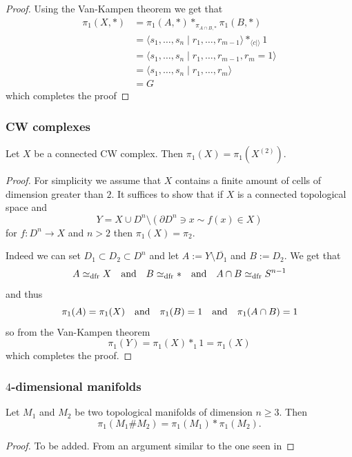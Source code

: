 \documentclass[11pt,a4paper]{article}
\begin{document}
\begin{proof}
  Using the Van-Kampen theorem we get that
  \begin{align*}
    \pi_1(X,*) &= \pi_1(A,*) *_{\pi_{A \cap B,*}} \pi_1(B,*) \\
               &= \langle s_1,\dots,s_n \mid r_1,\dots,r_{m-1} \rangle
                  *_{\langle c \mid \rangle} 1 \\
               &= \langle s_1,\dots,s_n \mid r_1,\dots,r_{m-1},r_m = 1 
               \rangle \\
               &= \langle s_1,\dots,s_n \mid r_1,\dots,r_m \rangle \\
               &= G
  \end{align*}
  which completes the proof
\end{proof}

\subsubsection{CW complexes}
\begin{theorem}
  \label{thm:two-skeleton-determines-fundamental-group}
  Let $X$ be a connected CW complex.
  Then $\pi_1(X) = \pi_1(X^{(2)})$.
\end{theorem}
\begin{proof}
  For simplicity we assume that $X$ contains a finite amount of
  cells of dimension greater than $2$.
  It suffices to show that if $X$ is a connected topological space
  and
  \[
    Y = X \cup D^n \setminus (\partial D^n \ni x \sim f(x) \in X)
  \]
  for $f \colon D^n \to X$ and $n > 2$ then $\pi_1(X) = \pi_2$.

  Indeed we can set $D_1 \subset D_2 \subset D^n$ and let
  $A := Y \setminus \overline{D_1}$ and $B := D_2$. We get that
  \[
    A \simeq_{\operatorname{dfr}} X \quad \text{and} \quad
    B \simeq_{\operatorname{dfr}} * \quad \text{and} \quad
    A \cap B \simeq_{\operatorname{dfr}} S^{n-1}
  \]
  and thus
  \[
    \pi_1(A) = \pi_1(X) \quad \text{and} \quad
    \pi_1(B) = 1 \quad \text{and} \quad
    \pi_1(A \cap B) = 1
  \]
  so from the Van-Kampen theorem
  \[
    \pi_1(Y) = \pi_1(X) *_{1} 1 = \pi_1(X)
  \]
  which completes the proof.
\end{proof}

\subsubsection{\texorpdfstring{$4$}{4}-dimensional manifolds}

\begin{lemma}
  \label{lem:three-dimensional-manifolds-csum}
  Let $M_1$ and $M_2$ be two topological
  manifolds of dimension $n \geq 3$.
  Then
  \[
    \pi_1(M_1 \# M_2) = \pi_1(M_1) * \pi_1(M_2).
  \]
\end{lemma}
\begin{proof}
  To be added.
  From an argument similar to the one seen in
\end{proof}
\end{document}
